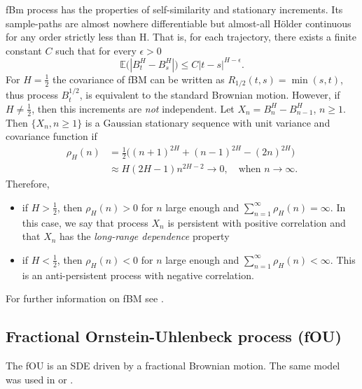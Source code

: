 \documentclass[smallextended]{svjour3}
\newcommand{\E}{\mathbb{E}}
\begin{document}
        fBm process has the properties of self-similarity and stationary increments.
    Its sample-paths are almost nowhere differentiable but almost-all H\"{o}lder continuous 
    for any order strictly less than H. That is, for each
    trajectory, there exists a finite constant $C$ such that for every
    $\epsilon > 0$
    \[
        \E \big(
            | B_t ^ H - B_s ^ H|
        \big)
        \le
        C |t - s| ^ {H - \epsilon} .
    \]
%
        For $H = \tfrac{1}{2} $ the covariance of fBM can be written as
    $
        R_{1 / 2} (t, s)
            = \min(s, t)
    $, thus process $B_t ^ {1 / 2}$, is equivalent to
    the standard Brownian motion. However, if $H \ne \tfrac{1}{2}$, 
    then this increments are \emph{not} independent.
%
    	Let  $X_n = B_n ^ H - B_{n - 1} ^ H$, $n \ge 1$.
    Then $\{X_n, n \ge 1\}$ is a Gaussian stationary sequence with unit
    variance and covariance function if
    \begin{align*}
        \rho_H (n) &=
            \frac{1}{2}
            \Big(
                (n + 1) ^ {2 H} + (n - 1) ^ {2 H}
                - (2 n) ^{2 H}
            \Big)
            \\
            &\approx
            H (2H - 1)n^{2H-2} \to 0, \quad \text{when }
        n \to \infty.
    \end{align*}
Therefore,
\begin{itemize}
    \item
        if $H > \tfrac{1}{2}$, then $\rho_H(n) > 0$ for $n$ large enough and
        $\sum_{n=1}^\infty \rho_H(n)=\infty$. In this case, we say that
        process $X_n$ is persistent with positive correlation and that
        $X_n$ has the \emph{ long-range dependence} property

    \item
        if $H < \tfrac{1}{2}$, then $\rho_H(n) < 0$ for $n$ large enough and
        $\sum_{n=1}^\infty \rho_H(n)<\infty$.
        This is an anti-persistent process with negative correlation.
\end{itemize}
    For further information on fBM see \cite{ra,nu,mi}.

\subsection{Fractional Ornstein-Uhlenbeck process (fOU)}


The fOU is an SDE driven by a fractional Brownian motion. The same model was
used in \cite{mi-pr} or \cite{gi-or-be}.
\end{document}
